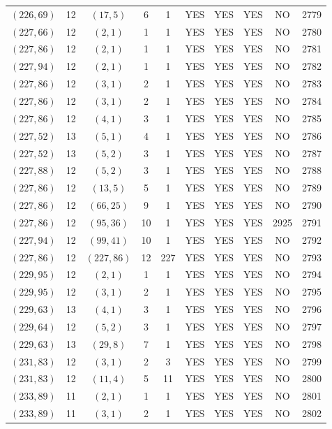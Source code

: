 \begin{longtable}{|c|c|c|c|c|c|c|c|c|c|}
$(226, 69)$ & 12 & $(17, 5)$ & 6 & 1 & YES & YES & YES & NO & 2779\\
$(227, 66)$ & 12 & $(2, 1)$ & 1 & 1 & YES & YES & YES & NO & 2780\\
$(227, 86)$ & 12 & $(2, 1)$ & 1 & 1 & YES & YES & YES & NO & 2781\\
$(227, 94)$ & 12 & $(2, 1)$ & 1 & 1 & YES & YES & YES & NO & 2782\\
$(227, 86)$ & 12 & $(3, 1)$ & 2 & 1 & YES & YES & YES & NO & 2783\\
$(227, 86)$ & 12 & $(3, 1)$ & 2 & 1 & YES & YES & YES & NO & 2784\\
$(227, 86)$ & 12 & $(4, 1)$ & 3 & 1 & YES & YES & YES & NO & 2785\\
$(227, 52)$ & 13 & $(5, 1)$ & 4 & 1 & YES & YES & YES & NO & 2786\\
$(227, 52)$ & 13 & $(5, 2)$ & 3 & 1 & YES & YES & YES & NO & 2787\\
$(227, 88)$ & 12 & $(5, 2)$ & 3 & 1 & YES & YES & YES & NO & 2788\\
$(227, 86)$ & 12 & $(13, 5)$ & 5 & 1 & YES & YES & YES & NO & 2789\\
$(227, 86)$ & 12 & $(66, 25)$ & 9 & 1 & YES & YES & YES & NO & 2790\\
$(227, 86)$ & 12 & $(95, 36)$ & 10 & 1 & YES & YES & YES & 2925 & 2791\\
$(227, 94)$ & 12 & $(99, 41)$ & 10 & 1 & YES & YES & YES & NO & 2792\\
$(227, 86)$ & 12 & $(227, 86)$ & 12 & 227 & YES & YES & YES & NO & 2793\\
$(229, 95)$ & 12 & $(2, 1)$ & 1 & 1 & YES & YES & YES & NO & 2794\\
$(229, 95)$ & 12 & $(3, 1)$ & 2 & 1 & YES & YES & YES & NO & 2795\\
$(229, 63)$ & 13 & $(4, 1)$ & 3 & 1 & YES & YES & YES & NO & 2796\\
$(229, 64)$ & 12 & $(5, 2)$ & 3 & 1 & YES & YES & YES & NO & 2797\\
$(229, 63)$ & 13 & $(29, 8)$ & 7 & 1 & YES & YES & YES & NO & 2798\\
$(231, 83)$ & 12 & $(3, 1)$ & 2 & 3 & YES & YES & YES & NO & 2799\\
$(231, 83)$ & 12 & $(11, 4)$ & 5 & 11 & YES & YES & YES & NO & 2800\\
$(233, 89)$ & 11 & $(2, 1)$ & 1 & 1 & YES & YES & YES & NO & 2801\\
$(233, 89)$ & 11 & $(3, 1)$ & 2 & 1 & YES & YES & YES & NO & 2802\\

\end{longtable}
